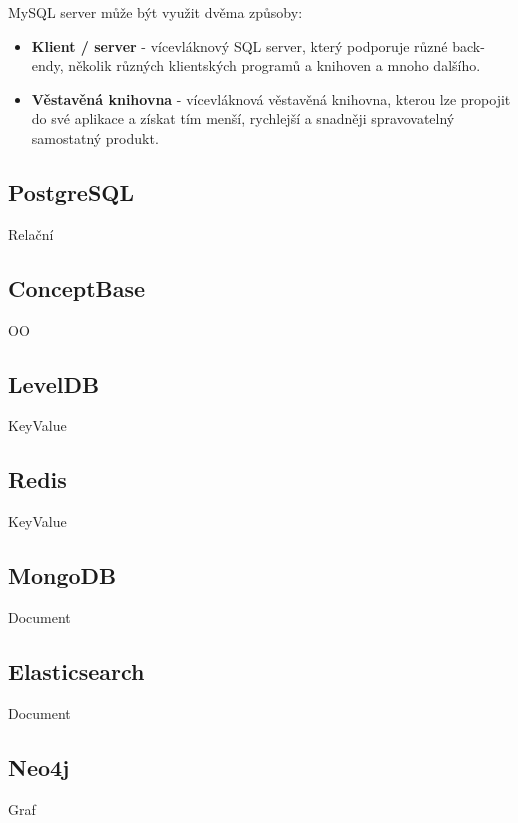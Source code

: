 \noindent MySQL server může být využit dvěma způsoby:
\begin{itemize}
\item \textbf{Klient / server} - vícevláknový \gls{SQL} server, který podporuje různé back-endy, několik různých klientských programů a knihoven a mnoho dalšího.
\item \textbf{Věstavěná knihovna} - vícevláknová věstavěná knihovna, kterou lze propojit do své aplikace a získat tím menší, rychlejší a snadněji spravovatelný samostatný produkt.
\end{itemize}
\subsection{PostgreSQL}
Relační 
\subsection{ConceptBase}
OO 
\subsection{LevelDB}
KeyValue 
\subsection{Redis}
KeyValue 
\subsection{MongoDB}
Document 
\subsection{Elasticsearch}
Document 
\subsection{Neo4j}
Graf 

